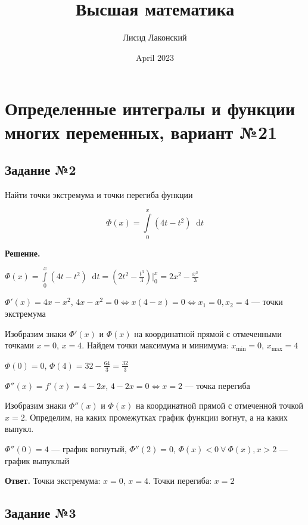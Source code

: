 \documentclass{article}
\title{Высшая математика}
\author{Лисид Лаконский}
\date{April 2023}
\newcommand*\diff{\mathop{}\!\mathrm{d}}
\begin{document}
\raggedright

\maketitle

\tableofcontents
\pagebreak

\section{Определенные интегралы и функции многих переменных, вариант №21}

\subsection{Задание №2}

Найти точки экстремума и точки перегиба функции

$$
\Phi(x) = \int\limits_{0}^{x} (4t - t^2) \diff t
$$

\textbf{Решение.}

$\Phi(x) = \int\limits_{0}^{x} (4t - t^2) \diff t = (2t^2 - \frac{t^3}{3}) \bigg|_{0}^{x} = 2x^2 - \frac{x^3}{3}$

$\Phi'(x) = 4x - x^2$, $4x - x^2 = 0 \Longleftrightarrow x (4 - x) = 0 \Longleftrightarrow x_1 = 0, x_2 = 4$ — точки экстремума

Изобразим знаки $\Phi'(x)$ и $\Phi(x)$ на координатной прямой с отмеченными точками $x = 0$, $x = 4$. Найдем точки максимума и минимума: $x_{\text{min}} = 0$, $x_{\text{max}} = 4$

$\Phi(0) = 0$, $\Phi(4) = 32 - \frac{64}{3} = \frac{32}{3}$

\hfill

$\Phi''(x) = f'(x) = 4 - 2x$, $4 - 2x = 0 \Longleftrightarrow x = 2$ — точка перегиба

Изобразим знаки $\Phi''(x)$ и $\Phi(x)$ на координатной прямой с отмеченной точкой $x = 2$. Определим, на каких промежутках график функции вогнут, а на каких выпукл.

$\Phi''(0) = 4$ — график вогнутый, $\Phi''(2) = 0$, $\Phi(x) < 0 \ \forall \ \Phi(x), x > 2$ — график выпуклый

\hfill

\textbf{Ответ.} Точки экстремума: $x = 0$, $x = 4$. Точки перегиба: $x = 2$

\subsection{Задание №3}
\end{document}
